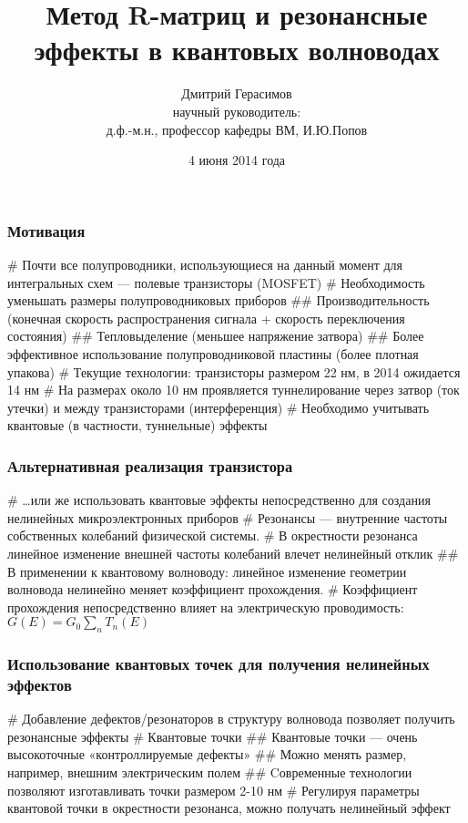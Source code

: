 \documentclass{beamer}
\title[]{Метод R-матриц и резонансные эффекты в квантовых волноводах}
\author[Дмитрий Герасимов]{Дмитрий Герасимов\\{\small научный руководитель: \\ д.ф.-м.н., профессор кафедры ВМ, И.Ю.Попов}}
\institute[ИТМО]{Университет ИТМО}
\date{4 июня 2014 года}
\begin{document}
\maketitle

\begin{frame}[fragile]
\frametitle{Мотивация}
\begin{easylist}[itemize]
# Почти все полупроводники, использующиеся на данный момент для интегральных схем — полевые транзисторы (MOSFET)
# Необходимость уменьшать размеры полупроводниковых приборов
## Производительность (конечная скорость распространения сигнала + скорость переключения состояния)
## Тепловыделение (меньшее напряжение затвора)
## Более эффективное использование полупроводниковой пластины (более плотная упакова)
# Текущие технологии: транзисторы размером 22 нм, в 2014 ожидается 14 нм
# На размерах около 10 нм проявляется туннелирование через затвор (ток утечки) и между транзисторами (интерференция)
# Необходимо учитывать квантовые (в частности, туннельные) эффекты
\end{easylist}
\end{frame}

\begin{frame}[fragile]
\frametitle{Альтернативная реализация транзистора}
\begin{easylist}[itemize]
# \dots или же использовать квантовые эффекты непосредственно для создания нелинейных микроэлектронных приборов
# Резонансы — внутренние частоты собственных колебаний физической системы.
# В окрестности резонанса линейное изменение внешней частоты колебаний влечет нелинейный отклик
## В применении к квантовому волноводу: линейное изменение геометрии волновода нелинейно меняет коэффициент прохождения.
# Коэффициент прохождения непосредственно влияет на электрическую проводимость: $G(E) = G_0 \sum\limits_n T_n(E)$
\end{easylist}
\end{frame}

\begin{frame}[fragile]
\frametitle{Использование квантовых точек для получения нелинейных эффектов}
\begin{easylist}[itemize]
# Добавление дефектов/резонаторов в структуру волновода позволяет получить резонансные эффекты
# Квантовые точки
## Квантовые точки — очень высокоточные «контроллируемые дефекты»
## Можно менять размер, например, внешним электрическим полем
## Cовременные технологии позволяют изготавливать точки размером 2-10 нм
# Регулируя параметры квантовой точки в окрестности резонанса, можно получать нелинейный эффект
\end{easylist}
\end{frame}
\end{document}
